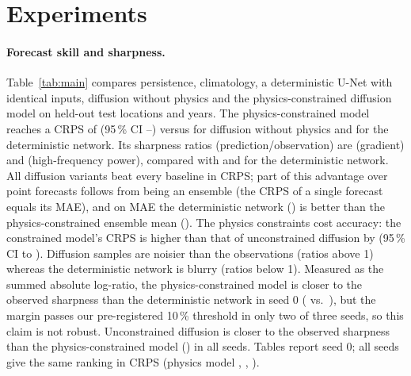 \documentclass[10pt]{article}
\begin{document}
\section{Experiments}

\paragraph{Forecast skill and sharpness.} Table~\ref{tab:main} compares persistence, climatology, a deterministic
U-Net with identical inputs, diffusion without physics and the physics-constrained diffusion model on held-out test
locations and years. The physics-constrained model reaches a CRPS of  (95\,\% CI
--) versus  for diffusion without physics and
 for the deterministic network. Its sharpness ratios (prediction/observation) are
 (gradient) and  (high-frequency power), compared with
 and  for the deterministic network. All diffusion variants beat every baseline
in CRPS; part of this advantage over point forecasts follows from being an ensemble (the CRPS of a single forecast
equals its MAE), and on MAE the deterministic network () is better than the physics-constrained ensemble
mean (). The physics constraints cost accuracy: the constrained model's CRPS is higher than that
of unconstrained diffusion by  (95\,\% CI  to
). Diffusion samples are noisier than the observations (ratios above 1) whereas the
deterministic network is blurry (ratios below 1). Measured as the summed absolute log-ratio, the physics-constrained
model is closer to the observed sharpness than the deterministic network in seed 0 (
vs.\ ), but the margin passes our pre-registered 10\,\% threshold in only two of three
seeds, so this claim is not robust. Unconstrained diffusion is closer to the observed sharpness than the
physics-constrained model () in all seeds. Tables report seed 0; all seeds give the same
ranking in CRPS (physics model , , ).


\end{document}
